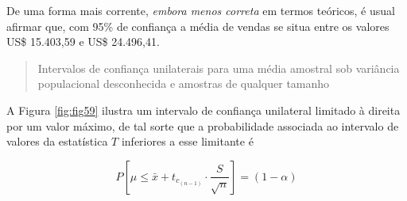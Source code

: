 \documentclass[
]{book}
\begin{document}
De uma forma mais corrente, \emph{embora menos correta} em termos teóricos, é usual afirmar que, com 95\% de confiança a média de vendas se situa entre os valores US\$ 15.403,59 e US\$ 24.496,41.

\hfill\break

\begin{quote}
Intervalos de confiança unilaterais para uma média amostral sob variância populacional desconhecida e amostras de qualquer tamanho
\end{quote}

\hfill\break

A Figura \ref{fig:fig59} ilustra um intervalo de confiança unilateral limitado à direita por um valor máximo, de tal sorte que a probabilidade associada ao intervalo de valores da estatística \(T\) inferiores a esse limitante é

\hfill\break

\[
P\left [\mu \le \bar{x} + {t}_{c_{(n-1)}} \cdot  \frac{S}{\sqrt{n}} \right ] = (1- \alpha)
\]

\hfill\break
\end{document}
